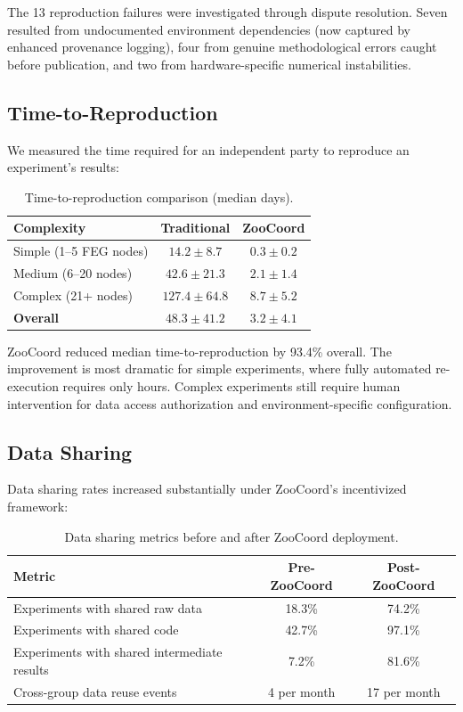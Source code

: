 The 13 reproduction failures were investigated through dispute resolution.
Seven resulted from undocumented environment dependencies (now captured by enhanced provenance logging), four from genuine methodological errors caught before publication, and two from hardware-specific numerical instabilities.

\subsection{Time-to-Reproduction}

We measured the time required for an independent party to reproduce an experiment's results:

\begin{table}[H]
\centering
\caption{Time-to-reproduction comparison (median days).}
\label{tab:time}
\begin{tabular}{@{}lcc@{}}
\toprule
\textbf{Complexity} & \textbf{Traditional} & \textbf{ZooCoord} \\
\midrule
Simple (1--5 FEG nodes) & $14.2 \pm 8.7$ & $0.3 \pm 0.2$ \\
Medium (6--20 nodes) & $42.6 \pm 21.3$ & $2.1 \pm 1.4$ \\
Complex (21+ nodes) & $127.4 \pm 64.8$ & $8.7 \pm 5.2$ \\
\midrule
\textbf{Overall} & $48.3 \pm 41.2$ & $3.2 \pm 4.1$ \\
\bottomrule
\end{tabular}
\end{table}

ZooCoord reduced median time-to-reproduction by 93.4\% overall.
The improvement is most dramatic for simple experiments, where fully automated re-execution requires only hours.
Complex experiments still require human intervention for data access authorization and environment-specific configuration.

\subsection{Data Sharing}

Data sharing rates increased substantially under ZooCoord's incentivized framework:

\begin{table}[H]
\centering
\caption{Data sharing metrics before and after ZooCoord deployment.}
\label{tab:sharing}
\begin{tabular}{@{}lcc@{}}
\toprule
\textbf{Metric} & \textbf{Pre-ZooCoord} & \textbf{Post-ZooCoord} \\
\midrule
Experiments with shared raw data & 18.3\% & 74.2\% \\
Experiments with shared code & 42.7\% & 97.1\% \\
Experiments with shared intermediate results & 7.2\% & 81.6\% \\
Cross-group data reuse events & 4 per month & 17 per month \\
\bottomrule
\end{tabular}
\end{table}

